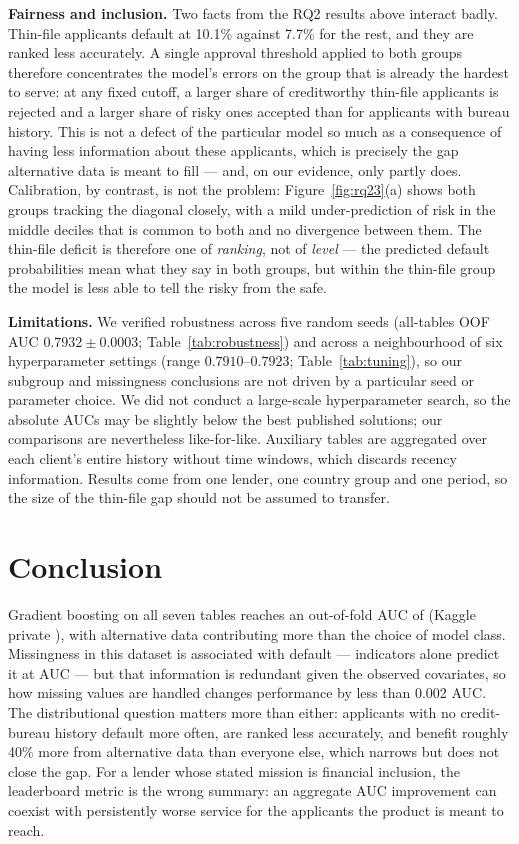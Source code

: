 \documentclass[10pt]{article}
\begin{document}
\textbf{Fairness and inclusion.} Two facts from the RQ2 results above interact badly. Thin-file applicants default at 10.1\% against 7.7\% for the rest, and they are ranked less accurately. A single approval threshold applied to both groups therefore concentrates the model's errors on the group that is already the hardest to serve: at any fixed cutoff, a larger share of creditworthy thin-file applicants is rejected and a larger share of risky ones accepted than for applicants with bureau history. This is not a defect of the particular model so much as a consequence of having less information about these applicants, which is precisely the gap alternative data is meant to fill --- and, on our evidence, only partly does. Calibration, by contrast, is not the problem: Figure~\ref{fig:rq23}(a) shows both groups tracking the diagonal closely, with a mild under-prediction of risk in the middle deciles that is common to both and no divergence between them. The thin-file deficit is therefore one of \emph{ranking}, not of \emph{level} --- the predicted default probabilities mean what they say in both groups, but within the thin-file group the model is less able to tell the risky from the safe.

\textbf{Limitations.} We verified robustness across five random seeds (all-tables OOF AUC $0.7932 \pm 0.0003$; Table~\ref{tab:robustness}) and across a neighbourhood of six hyperparameter settings (range $0.7910$--$0.7923$; Table~\ref{tab:tuning}), so our subgroup and missingness conclusions are not driven by a particular seed or parameter choice. We did not conduct a large-scale hyperparameter search, so the absolute AUCs may be slightly below the best published solutions; our comparisons are nevertheless like-for-like. Auxiliary tables are aggregated over each client's entire history without time windows, which discards recency information. Results come from one lender, one country group and one period, so the size of the thin-file gap should not be assumed to transfer.

\section{Conclusion}
Gradient boosting on all seven tables reaches an out-of-fold AUC of \AucLgbAll{} (Kaggle private \KagglePrivate{}), with alternative data contributing more than the choice of model class. Missingness in this dataset is associated with default --- indicators alone predict it at AUC \AucIndOnly{} --- but that information is redundant given the observed covariates, so how missing values are handled changes performance by less than 0.002 AUC. The distributional question matters more than either: applicants with no credit-bureau history default more often, are ranked less accurately, and benefit roughly 40\% more from alternative data than everyone else, which narrows but does not close the gap. For a lender whose stated mission is financial inclusion, the leaderboard metric is the wrong summary: an aggregate AUC improvement can coexist with persistently worse service for the applicants the product is meant to reach.
\end{document}
